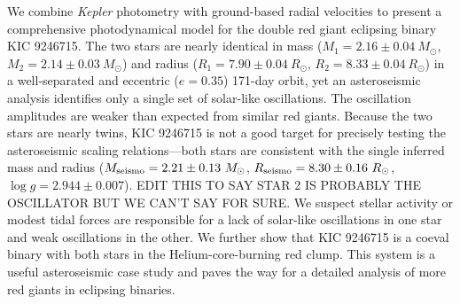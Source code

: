 We combine \emph{Kepler} photometry with ground-based radial velocities to present a comprehensive photodynamical model for the double red giant eclipsing binary KIC 9246715. The two stars are nearly identical in mass ($M_1 = 2.16 \pm 0.04\ M_{\odot}$, $M_2 = 2.14 \pm 0.03\ M_{\odot}$) and radius ($R_1 = 7.90 \pm 0.04 \ R_{\odot}$, $R_2 = 8.33 \pm 0.04 \ R_{\odot}$) in a well-separated and eccentric ($e = 0.35$) 171-day orbit, yet an asteroseismic analysis identifies only a single set of solar-like oscillations. The oscillation amplitudes are weaker than expected from similar red giants. Because the two stars are nearly twins, KIC 9246715 is not a good target for precisely testing the asteroseismic scaling relations---both stars are consistent with the single inferred mass and radius ($M_{\rm{seismo}} = 2.21 \pm 0.13 \ M_{\odot}$, $R_{\rm{seismo}} = 8.30 \pm 0.16 \ R_{\odot}$, $\log g = 2.944 \pm 0.007$). EDIT THIS TO SAY STAR 2 IS PROBABLY THE OSCILLATOR BUT WE CAN'T SAY FOR SURE. We suspect stellar activity or modest tidal forces are responsible for a lack of solar-like oscillations in one star and weak oscillations in the other. We further show that KIC 9246715 is a coeval binary with both stars in the Helium-core-burning red clump. This system is a useful asteroseismic case study and paves the way for a detailed analysis of more red giants in eclipsing binaries.
    
    
  